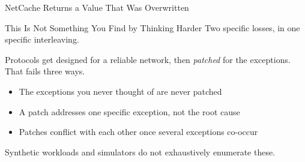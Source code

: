 \begin{frame}{NetCache Returns a Value That Was Overwritten}
  \vspace{0.1em}
  \begin{center}\netcachetrace\end{center}
  \vspace{0.2em}
  \begin{center}
    \begin{minipage}{0.94\textwidth}
      \centering
    \end{minipage}
  \end{center}
\end{frame}

\begin{frame}{This Is Not Something You Find by Thinking Harder}
  \vspace{0.4em}
  Two specific losses, in one specific interleaving.
  \vspace{0.5em}

  Protocols get designed for a reliable network,
  then \emph{patched} for the exceptions. That fails three ways.
  \vspace{0.9em}
  \begin{itemize}
    \item The exceptions you never thought of are never patched
    \item A patch addresses one specific exception, not the root cause
    \item Patches conflict with each other once several exceptions co-occur
  \end{itemize}
  \vspace{1.0em}
  \begin{center}
    \alert{Synthetic workloads and simulators do not exhaustively enumerate these.}
  \end{center}
\end{frame}


